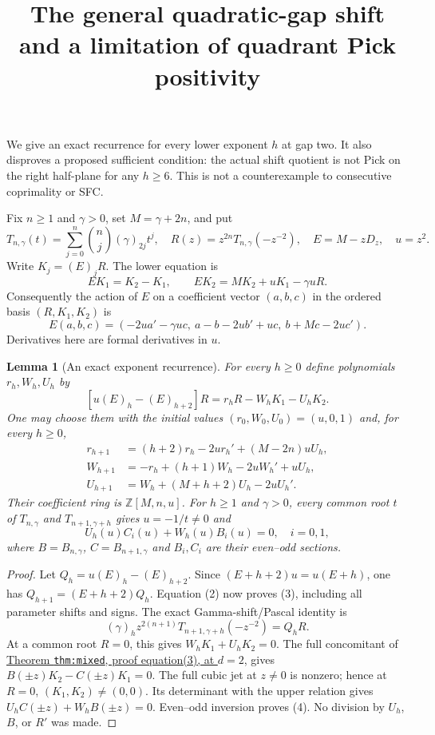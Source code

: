 \documentclass[11pt]{article}
\newtheorem{lemma}{Lemma}\newtheorem{proposition}{Proposition}
\begin{document}
\setlength{\emergencystretch}{1em}
\title{The general quadratic-gap shift and a limitation of quadrant Pick positivity}
\author{}\date{}\maketitle
We give an exact recurrence for every lower exponent
$h$ at gap two.  It also disproves a proposed sufficient condition:
the actual shift quotient is not Pick on the right half-plane for any
$h\ge6$.  This is not a counterexample to consecutive coprimality or SFC.

Fix $n\ge1$ and $\gamma>0$, set $M=\gamma+2n$, and put
\[
T_{n,\gamma}(t)=\sum_{j=0}^n\binom nj(\gamma)_{2j}t^j,\quad
R(z)=z^{2n}T_{n,\gamma}(-z^{-2}),\quad E=M-zD_z,\quad u=z^2.
\]
Write $K_j=(E)_jR$.  The lower equation is
\[
EK_1=K_2-K_1,\qquad EK_2=MK_2+uK_1-\gamma uR.       \tag{1}
\]
Consequently the action of $E$ on a coefficient vector $(a,b,c)$
in the ordered basis $(R,K_1,K_2)$ is
\[
E(a,b,c)=(-2ua'-\gamma uc,\ a-b-2ub'+uc,\ b+Mc-2uc').
                                                               \tag{2}
\]
Derivatives here are formal derivatives in $u$.

\begin{lemma}[An exact exponent recurrence]\label{lem:shift-recurrence}
For every $h\ge0$ define polynomials $r_h,W_h,U_h$ by
\[
[u(E)_h-(E)_{h+2}]R=r_hR-W_hK_1-U_hK_2.
\]
One may choose them with the initial values $(r_0,W_0,U_0)=(u,0,1)$
and, for every $h\ge0$,
\[
\begin{split}
r_{h+1}&=(h+2)r_h-2ur_h'+(M-2n)uU_h,\\
W_{h+1}&=-r_h+(h+1)W_h-2uW_h'+uU_h,\\
U_{h+1}&=W_h+(M+h+2)U_h-2uU_h'.
\end{split} \tag{3}
\]
Their coefficient ring is $\mathbb Z[M,n,u]$.
For $h\ge1$ and $\gamma>0$, every common root $t$ of
$T_{n,\gamma}$ and $T_{n+1,\gamma+h}$ gives $u=-1/t\ne0$ and
\[
U_h(u)C_i(u)+W_h(u)B_i(u)=0,\quad i=0,1,             \tag{4}
\]
where $B=B_{n,\gamma}$, $C=B_{n+1,\gamma}$ and $B_i,C_i$
are their even--odd sections.
\end{lemma}
\begin{proof}
Let $Q_h=u(E)_h-(E)_{h+2}$.
Since $(E+h+2)u=u(E+h)$, one has
$Q_{h+1}=(E+h+2)Q_h$.  Equation (2) now proves (3), including
all parameter shifts and signs.
The exact Gamma-shift/Pascal identity is
\[
(\gamma)_h z^{2(n+1)}T_{n+1,\gamma+h}(-z^{-2})=Q_hR.
\]
At a common root $R=0$, this gives $W_hK_1+U_hK_2=0$.
The full concomitant of
\href{LOWER_TWO_PRIME_GAP_SFC.tex}
{Theorem \texttt{thm:mixed}, proof equation(3), at $d=2$},
gives $B(\pm z)K_2-C(\pm z)K_1=0$.
The full cubic jet at $z\ne0$ is nonzero; hence at $R=0$,
$(K_1,K_2)\ne(0,0)$.
Its determinant with the upper relation gives
$U_hC(\pm z)+W_hB(\pm z)=0$.  Even--odd inversion proves (4).
No division by $U_h$, $B$, or $R'$ was made.
\end{proof}
\end{document}

